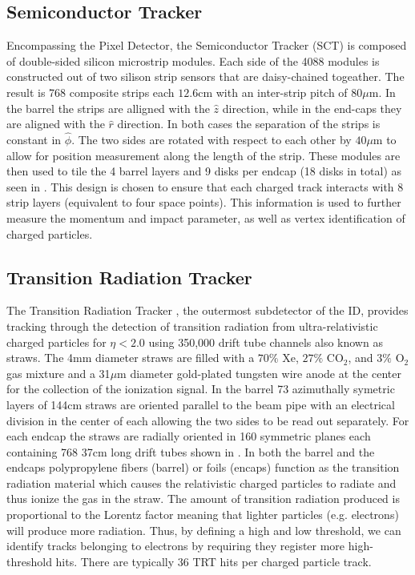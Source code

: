 \subsection{Semiconductor Tracker}

Encompassing the Pixel Detector, the Semiconductor Tracker (SCT)
\cite{PERF-2007-01} is composed of double-sided silicon microstrip modules.
Each side of the 4088 modules is constructed out of two silison strip sensors
that are daisy-chained togeather.  The result is 768 composite strips each
$12.6$cm with an inter-strip pitch of $80 \mu$m. In the barrel the strips are
alligned with the $\hat{z}$ direction, while in the end-caps they are aligned
with the $\hat{r}$ direction. In both cases the separation of the strips is
constant in $\hat{\phi}$. The two sides are rotated with respect to each other
by $40 \mu$m to allow for position measurement along the length of the strip.
These modules are then used to tile the 4 barrel layers and 9 disks per endcap
(18 disks in total) as seen in .  This
design is chosen to ensure that each charged track interacts with 8 strip
layers (equivalent to four space points).  This information is used to further
measure the momentum and impact parameter, as well as vertex identification of
charged particles.

\subsection{Transition Radiation Tracker}

The Transition Radiation Tracker \cite{PERF-2007-01}, the outermost subdetector
of the ID, provides tracking through the detection of transition radiation from
ultra-relativistic charged particles for $\eta < 2.0$ using 350,000 drift tube
channels also known as straws.  The 4mm diameter straws are filled with a $70\%$
Xe, $27\%$ CO$_2$, and $3\%$ O$_2$ gas mixture and a 31$\mu$m diameter
gold-plated tungsten wire anode at the center for the collection of the
ionization signal. In the barrel 73 azimuthally symetric layers of 144cm straws
are oriented parallel to the beam pipe with an electrical division in the center
of each allowing the two sides to be read out separately.  For each endcap the
straws are radially oriented in 160 symmetric planes each containing 768 37cm
long drift tubes shown in .  In both
the barrel and the endcaps polypropylene fibers (barrel) or foils (encaps)
function as the transition radiation material which causes the relativistic
charged particles to radiate and thus ionize the gas in the straw.  The amount
of transition radiation produced is proportional to the Lorentz factor meaning
that lighter particles (e.g. electrons) will produce more radiation.  Thus, by
defining a high and low threshold, we can identify tracks belonging to electrons
by requiring they register more high-threshold hits. There are typically 36 TRT
hits per charged particle track. 
